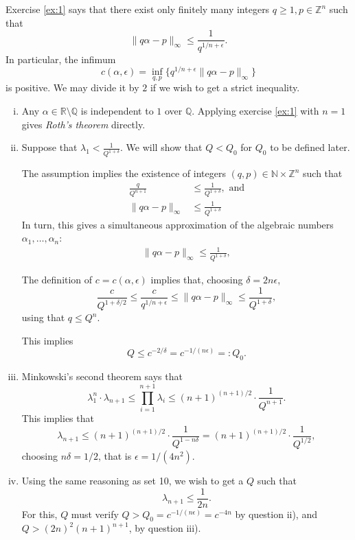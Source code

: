 \documentclass[12pt,a4paper]{article}
\theoremstyle{plain}
\theoremstyle{definition}
\def \N {\mathbb N}
\def \Q {\mathbb Q}
\def \R {\mathbb R}
\def \Z {\mathbb Z}
\begin{document}
{
	Exercise \ref{ex:1} says that there exist only finitely many integers $q \geq1, p\in\Z^n$ such that
		\[ \|q \alpha - p \|_\infty \leq \frac{1}{q^{1/n + \epsilon}}. \]
	In particular, the infimum
		\[ c(\alpha, \epsilon) = \inf_{q, p} \{  q^{1/n + \epsilon} \|q \alpha - p \|_\infty \} \]
	is positive.
	We may divide it by $2$ if we wish to get a strict inequality.

	\begin{enumerate}[i)]
		\item 
		Any $\alpha \in \R \setminus\Q$ is independent to $1$ over $\Q$.
		Applying exercise \ref{ex:1} with $n=1$ gives \emph{Roth's theorem} directly.

		\item
		Suppose that
			$ \lambda_1 < \frac{1}{Q^{1+\delta}} .$
		We will show that $Q < Q_0$ for $Q_0$ to be defined later.
	
		The assumption implies the existence of integers $(q, p) \in \N \times \Z^n$ such that
		\begin{align*}
			\frac{q}{Q^{n+1}} &\leq \frac{1}{Q^{1+\delta}}, \text{ and} \\
			\| q \alpha - p \|_\infty &\leq \frac{1}{Q^{1+\delta}}
		\end{align*}
		In turn, this gives a simultaneous approximation of the algebraic numbers $\alpha_1, \dots, \alpha_n$:
		\begin{align*}
			\| q \alpha - p \|_\infty \leq \frac{1}{Q^{1+\delta}},
		\end{align*}

		The definition of $c=c(\alpha, \epsilon)$ implies that, choosing $\delta = 2 n \epsilon$,
			\[  \frac{c}{Q^{1 + \delta/2}} \leq \frac{c}{q^{1/n + \epsilon}} \leq  \| q \alpha - p \|_\infty \leq \frac{1}{Q^{1+\delta}}, \]
		using that $q \leq Q^n$.

		This implies
			\[ Q \leq c^{-2/\delta} = c^{-1/(n \epsilon)} =: Q_0. \]

		\item 
		Minkowski's second theorem says that
			\[ \lambda_1^n \cdot \lambda_{n+1} \leq \prod_{i=1}^{n+1} \lambda_i \leq (n+1)^{(n+1)/2} \cdot \frac{1}{Q^{n+1}}. \]
		This implies that
			\[ \lambda_{n+1} \leq (n+1)^{(n+1)/2} \cdot \frac{1}{Q^{1-n\delta}} = (n+1)^{(n+1)/2} \cdot \frac{1}{Q^{1/2}}, \]
		choosing $n\delta = 1/2$, that is $\epsilon = 1/(4n^2)$.

		\item 
		Using the same reasoning as set 10, we wish to get a $Q$ such that
			\[ \lambda_{n+1} \leq \frac{1}{2n}. \]
		For this, $Q$ must verify $Q > Q_0 = c^{-1/(n\epsilon)} = c^{-4n}$ by question ii), and $Q > (2n)^2 (n+1)^{n+1}$, by question iii).


\end{enumerate}}
\end{document}
